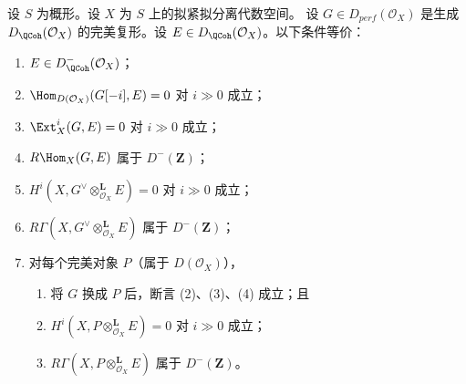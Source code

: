 \begin{proposition}
\label{proposition-detecting-bounded-above}
设 $S$ 为概形。设 $X$ 为 $S$ 上的拟紧拟分离代数空间。
设 $G \in D_{perf}(\mathcal{O}_X)$ 是生成
$D_\QCoh (\mathcal{O}_X)$ 的完美复形。设
$E \in D_\QCoh (\mathcal{O}_X)$。以下条件等价：
\begin{enumerate}
\item $E \in D^-_\QCoh (\mathcal{O}_X)$；
\item $\Hom_{D(\mathcal{O}_X)}(G[-i], E) = 0$
对 $i \gg 0$ 成立；
\item $\Ext^i_X(G, E) = 0$ 对 $i \gg 0$ 成立；
\item $R\Hom_X(G, E)$ 属于 $D^-(\mathbf{Z})$；
\item $H^i(X, G^\vee \otimes_{\mathcal{O}_X}^\mathbf{L} E) = 0$
对 $i \gg 0$ 成立；
\item $R\Gamma(X, G^\vee \otimes_{\mathcal{O}_X}^\mathbf{L} E)$
属于 $D^-(\mathbf{Z})$；
\item 对每个完美对象 $P$（属于 $D(\mathcal{O}_X)$），
\begin{enumerate}
\item 将 $G$ 换成 $P$ 后，断言 (2)、(3)、(4) 成立；且
\item $H^i(X, P \otimes_{\mathcal{O}_X}^\mathbf{L} E) = 0$
对 $i \gg 0$ 成立；
\item $R\Gamma(X, P \otimes_{\mathcal{O}_X}^\mathbf{L} E)$
属于 $D^-(\mathbf{Z})$。
\end{enumerate}
\end{enumerate}
\end{proposition}

